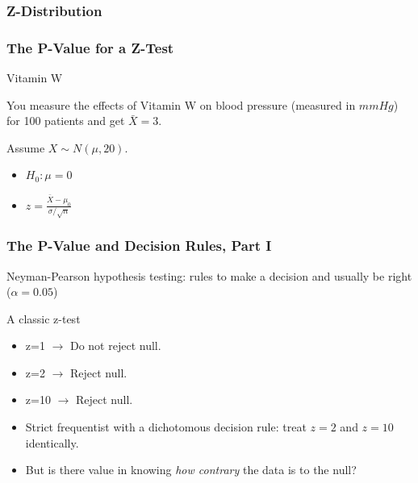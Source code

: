 \documentclass[12pt, block=fill]{beamer}
\begin{document}
\begin{frame}
  \frametitle{Z-Distribution}
  
\end{frame}
  
\begin{frame}
  \frametitle{The P-Value for a Z-Test}
   
  \begin{exampleblock}{Vitamin W}
     
    You measure the effects of Vitamin W on blood pressure (measured
    in $mmHg$) for 100 patients and get $\bar{X} =3$.
     
    Assume $X \sim N(\mu,20)$.
     
    \begin{itemize}
    \item $H_0: \mu=0$
    \item $z = \frac{\bar{X} - \mu_0}{\sigma / \sqrt{n}} $
    \end{itemize}
  \end{exampleblock}
   
\end{frame}
 
\begin{frame}
  \frametitle{The P-Value and Decision Rules, Part I}

  Neyman-Pearson hypothesis testing: rules to make a decision and
  usually be right ($\alpha = 0.05$)

  \begin{exampleblock}{A classic z-test}
    \begin{itemize}
    \item z=1 $\rightarrow$ Do not reject null.
    \item z=2 $\rightarrow$ Reject null.
    \item z=10 $\rightarrow$ Reject null.
    \end{itemize}
  \end{exampleblock}

  \begin{itemize}
  \item Strict frequentist with a dichotomous decision rule: treat
    $z=2$ and $z=10$ identically.
  \item But is there value in knowing \textit{how contrary} the data
    is to the null?
  \end{itemize}
\end{frame}
\end{document}
